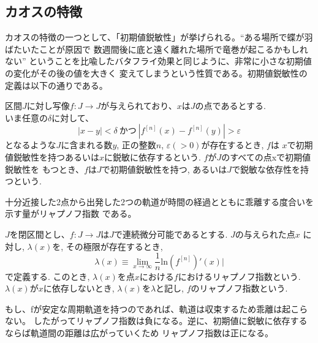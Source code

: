 \documentclass[12pt]{ltjsarticle}
\begin{document}
\subsection{カオスの特徴}
カオスの特徴の一つとして、「初期値鋭敏性」が挙げられる。“ある場所で蝶が羽ばたいたことが原因で
数週間後に底と遠く離れた場所で竜巻が起こるかもしれない”
ということを比喩したバタフライ効果と同じように、非常に小さな初期値の変化がその後の値を大きく
変えてしまうという性質である。初期値鋭敏性の定義は以下の通りである。\\
\begin{tcolorbox}
    区間$J$に対し写像$f:J \rightarrow J$が与えられており、$x$は$J$の点であるとする.\\
    いま任意の$\delta$に対して、
    \begin{equation*}
        |x-y| < \delta \ かつ \ |f^{[n]}(x) - f^{[n]}(y)| > \varepsilon
    \end{equation*}
    となるような$J$に含まれる数$y$, 正の整数$n$, $\varepsilon(>0)$が存在するとき, $f$は
    $x$で初期値鋭敏性を持つあるいは$x$に鋭敏に依存するという. $f$が$J$のすべての点xで初期値鋭敏性を
    もつとき、$f$は$J$で初期値鋭敏性を持つ, あるいは$J$で鋭敏な依存性を持つという.\cite{chaos}
\end{tcolorbox}

十分近接した2点から出発した2つの軌道が時間の経過とともに乖離する度合いを示す量がリャプノフ指数
である。\\
\begin{tcolorbox}
    $J$を閉区間とし、$f:J \rightarrow J$は$J$で連続微分可能であるとする. $J$の与えられた点$x$
    に対し, $\lambda(x)$を, その極限が存在するとき,
    \begin{equation*}
        \lambda(x) \equiv \lim_{x \to \infty} \frac{1}{n}\text{ln}\left(f^{[n]}\right)'(x)|
    \end{equation*}
    で定義する. このとき, $\lambda(x)$を点$x$における$f$におけるリャプノフ指数という.\\
    $\lambda(x)$が$x$に依存しないとき, $\lambda(x)$を$\lambda$と記し, $f$のリャプノフ指数という.\cite{chaos}
\end{tcolorbox}

もし、fが安定な周期軌道を持つのであれば、軌道は収束するため乖離は起こらない。
したがってリャプノフ指数は負になる。逆に、初期値に鋭敏に依存するならば軌道間の距離は広がっていくため
リャプノフ指数は正になる。
\end{document}
